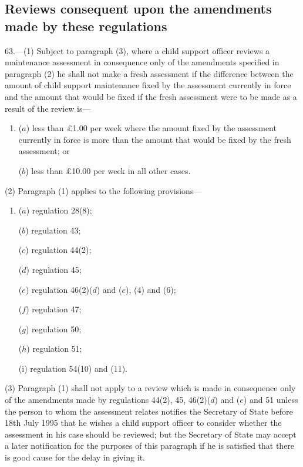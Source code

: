 \documentclass[a4paper]{article}
\begin{document}
\subsection[63. Reviews consequent upon the amendments made by these regulations]{Reviews consequent upon the amendments made by these regulations}

63.—(1) Subject to paragraph (3), where a child support officer reviews a maintenance assessment in consequence only of the amendments specified in paragraph (2) he shall not make a fresh assessment if the difference between the amount of child support maintenance fixed by the assessment currently in force and the amount that would be fixed if the fresh assessment were to be made as a result of the review is—
\begin{enumerate}\item[]
($a$) less than £1.00 per week where the amount fixed by the assessment currently in force is more than the amount that would be fixed by the fresh assessment; or

($b$) less than £10.00 per week in all other cases.
\end{enumerate}

(2) Paragraph (1) applies to the following provisions—
\begin{enumerate}\item[]
($a$) regulation 28(8);

($b$) regulation 43;

($c$) regulation 44(2);

($d$) regulation 45;

($e$) regulation 46(2)($d$) and ($e$), (4) and (6);

($f$) regulation 47;

($g$) regulation 50;

($h$) regulation 51;

(i) regulation 54(10) and (11).
\end{enumerate}

(3) Paragraph (1) shall not apply to a review which is made in consequence only of the amendments made by regulations 44(2), 45, 46(2)($d$) and ($e$) and 51 unless the person to whom the assessment relates notifies the Secretary of State before 18th July 1995 that he wishes a child support officer to consider whether the assessment in his case should be reviewed; but the Secretary of State may accept a later notification for the purposes of this paragraph if he is satisfied that there is good cause for the delay in giving it.
\end{document}

